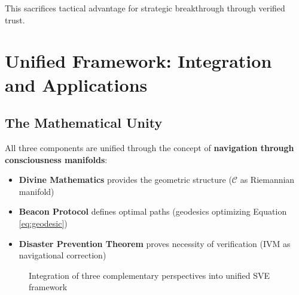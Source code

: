 \documentclass[11pt,a4paper]{article}
\theoremstyle{definition}
\theoremstyle{remark}
\newcommand{\CC}{\mathcal{C}}
\begin{document}
\begin{small}
This sacrifices tactical advantage for strategic breakthrough through verified trust.

\section{Unified Framework: Integration and Applications}

\subsection{The Mathematical Unity}

All three components are unified through the concept of \textbf{navigation through consciousness manifolds}:

\begin{itemize}
\item \textbf{Divine Mathematics} provides the geometric structure ($\CC$ as Riemannian manifold)
\item \textbf{Beacon Protocol} defines optimal paths (geodesics optimizing Equation \ref{eq:geodesic})
\item \textbf{Disaster Prevention Theorem} proves necessity of verification (IVM as navigational correction)
\end{itemize}

\begin{figure}[h]
\centering
{}
\caption{Integration of three complementary perspectives into unified SVE framework}
\end{figure}


\end{small}
\end{document}
